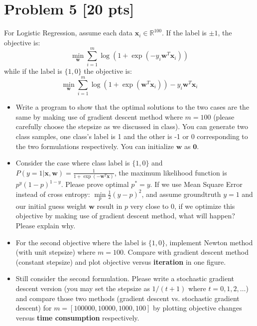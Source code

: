 \documentclass[11pt]{article}
\newcommand{\R}{\mathbb{R}}
\newcommand{\vct}[1]{\mathbf{#1}}
\def \vzero    {\vct{0}}
\def \vw {\vct{w}}
\def \vx {\vct{x}}
\def \R {\mathbb{R}}
\begin{document}
\section*{Problem 5 [20 pts]}
For Logistic Regression, assume each data $\vx_i\in\R^{100}$. If the label is $\pm1$,  the objective is:
\begin{equation}
\min_\vw	\sum_{i=1}^{m}\log(1+\exp(-y_i\vw^T\vx_i))
\end{equation}
while if the label is $\{1,0\}$ the objective is:
\begin{equation}
	\min_\vw	\sum_{i=1}^{m}\log(1+\exp(\vw^T\vx_i))-y_i\vw^T\vx_i
\end{equation}
\begin{itemize}
	\item Write a program to show that the optimal solutions to the two cases  are the same by making use of gradient descent method where $m=100$ (please carefully choose the stepsize as we discussed in class). You can generate two class samples, one class's label is 1 and the other is -1 or 0 corresponding to the two formulations respectively. You can initialize $\vw$ as $\vzero$.
	\item Consider the case where class label is $\{1,0\}$ and $P(y=1|\vx,\vw)=\frac{1}{1+\exp(-\vw^T\vx)}$, the maximum likelihood function is $p^y(1-p)^{1-y}$. Please prove optimal $p^*=y$. If we use Mean Square Error instead of cross entropy: $\min\limits_p \frac{1}{2}(y-p)^2$, and assume groundtruth $y=1$ and our initial guess weight $\vw$ result in $p$ very close to 0, if we optimize this objective by making use of gradient descent method, what will happen? Please explain why.
	\item For the second objective where the label is $\{1,0\}$, implement Newton method (with unit stepsize) where $m=100$.  Compare with gradient descent method (constant stepsize) and plot objective versus \textbf{iteration} in one figure.
	\item Still consider the second formulation. Please write a stochastic gradient descent version (you may set the stepsize as $1/(t+1)$ where $t=0,1,2,\dots$) and compare those two methods (gradient descent vs. stochastic gradient descent) for $m=[100000,10000,1000,100]$ by plotting objective changes versus \textbf{time consumption} respectively.
\end{itemize}

\newpage
\end{document}
